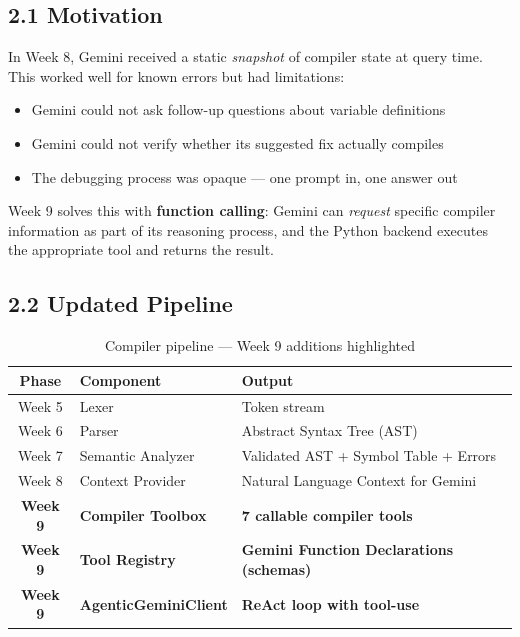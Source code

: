 \documentclass[a4paper,11pt]{article}
\begin{document}
\subsection{2.1 Motivation}

In Week 8, Gemini received a static \textit{snapshot} of compiler state at query time. This worked well for known errors but had limitations:
\begin{itemize}
    \item Gemini could not ask follow-up questions about variable definitions
    \item Gemini could not verify whether its suggested fix actually compiles
    \item The debugging process was opaque --- one prompt in, one answer out
\end{itemize}

Week 9 solves this with \textbf{function calling}: Gemini can \textit{request} specific compiler information as part of its reasoning process, and the Python backend executes the appropriate tool and returns the result.

\subsection{2.2 Updated Pipeline}

\begin{table}[h]
\centering
\begin{tabularx}{\textwidth}{|c|l|X|}
\hline
\rowcolor{blue!10}
\textbf{Phase} & \textbf{Component} & \textbf{Output} \\
\hline
Week 5 & Lexer & Token stream \\
\hline
Week 6 & Parser & Abstract Syntax Tree (AST) \\
\hline
Week 7 & Semantic Analyzer & Validated AST + Symbol Table + Errors \\
\hline
Week 8 & Context Provider & Natural Language Context for Gemini \\
\hline
\textbf{Week 9} & \textbf{Compiler Toolbox} & \textbf{7 callable compiler tools} \\
\hline
\textbf{Week 9} & \textbf{Tool Registry} & \textbf{Gemini Function Declarations (schemas)} \\
\hline
\textbf{Week 9} & \textbf{AgenticGeminiClient} & \textbf{ReAct loop with tool-use} \\
\hline
\end{tabularx}
\caption{Compiler pipeline --- Week 9 additions highlighted}
\end{table}
\end{document}
